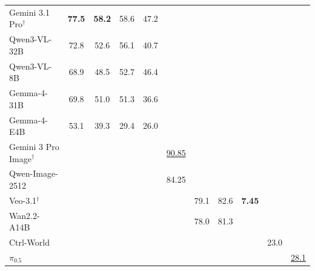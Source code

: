 \begin{table}[t]
{\begin{tabular}{l|cccc|cccccc}
        \midrule
        Gemini 3.1 Pro$^\dagger$ & \textbf{77.5} & \textbf{58.2} & 58.6 & 47.2 & \cellcolor{black!5} & \cellcolor{black!5} & \cellcolor{black!5} & \cellcolor{black!5} & \cellcolor{black!5} & \cellcolor{black!5} \\
        Qwen3-VL-32B & 72.8 & 52.6 & 56.1 & 40.7 & \cellcolor{black!5} & \cellcolor{black!5} & \cellcolor{black!5} & \cellcolor{black!5} & \cellcolor{black!5} & \cellcolor{black!5} \\
        Qwen3-VL-8B & 68.9 & 48.5 & 52.7 & 46.4 & \cellcolor{black!5} & \cellcolor{black!5} & \cellcolor{black!5} & \cellcolor{black!5} & \cellcolor{black!5} & \cellcolor{black!5} \\
        Gemma-4-31B & 69.8 & 51.0 & 51.3 & 36.6 & \cellcolor{black!5} & \cellcolor{black!5} & \cellcolor{black!5} & \cellcolor{black!5} & \cellcolor{black!5} & \cellcolor{black!5} \\
        Gemma-4-E4B & 53.1 & 39.3 & 29.4 & 26.0 & \cellcolor{black!5} & \cellcolor{black!5} & \cellcolor{black!5} & \cellcolor{black!5} & \cellcolor{black!5} & \cellcolor{black!5} \\
        Gemini 3 Pro Image$^\dagger$ & \cellcolor{black!5} & \cellcolor{black!5} & \cellcolor{black!5} & \cellcolor{black!5} & \underline{90.85} & \cellcolor{black!5} & \cellcolor{black!5} & \cellcolor{black!5} & \cellcolor{black!5} & \cellcolor{black!5} \\
        Qwen-Image-2512 & \cellcolor{black!5} & \cellcolor{black!5} & \cellcolor{black!5} & \cellcolor{black!5} & 84.25 & \cellcolor{black!5} & \cellcolor{black!5} & \cellcolor{black!5} & \cellcolor{black!5} & \cellcolor{black!5} \\
        Veo-3.1$^\dagger$ & \cellcolor{black!5} & \cellcolor{black!5} & \cellcolor{black!5} & \cellcolor{black!5} & \cellcolor{black!5} & 79.1 & 82.6 & \textbf{7.45} & \cellcolor{black!5} & \cellcolor{black!5} \\
        Wan2.2-A14B & \cellcolor{black!5} & \cellcolor{black!5} & \cellcolor{black!5} & \cellcolor{black!5} & \cellcolor{black!5} & 78.0 & 81.3 & \cellcolor{black!5} & \cellcolor{black!5} & \cellcolor{black!5} \\
        Ctrl-World & \cellcolor{black!5} & \cellcolor{black!5} & \cellcolor{black!5} & \cellcolor{black!5} & \cellcolor{black!5} & \cellcolor{black!5} & \cellcolor{black!5} & \cellcolor{black!5} & 23.0 & \cellcolor{black!5} \\
        $\pi_{0.5}$ & \cellcolor{black!5} & \cellcolor{black!5} & \cellcolor{black!5} & \cellcolor{black!5} & \cellcolor{black!5} & \cellcolor{black!5} & \cellcolor{black!5} & \cellcolor{black!5} & \cellcolor{black!5} & \underline{28.1} \\
        \bottomrule
    \end{tabular}%
    }
\end{table}
